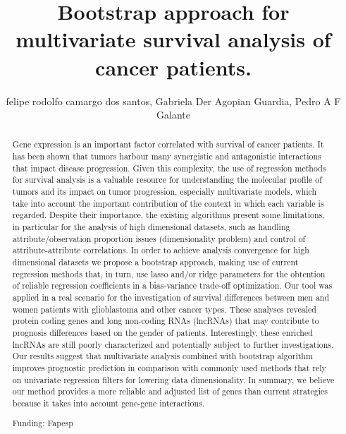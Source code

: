\documentclass[twoside]{article}
\title{\vspace{-15mm}\fontsize{24pt}{10pt}\selectfont\textbf{ Bootstrap approach for multivariate survival analysis of  cancer patients. }} %
\author{ felipe rodolfo camargo dos santos, Gabriela Der Agopian Guardia, Pedro A F Galante }
\affil{ Instituto de Ensino e Pesquisa - Hospital S\'{\i}rio Liban\^es }
\date{}
\begin{document}
  
  
  \maketitle %
  
  
  \thispagestyle{fancy} %
  
  
  \begin{abstract}
  Gene expression is an important factor correlated with survival of cancer patients. It has been shown that tumors harbour many synergistic and antagonistic interactions that impact disease progression. Given this complexity,  the use of regression methods for survival analysis is a valuable resource for understanding the molecular profile of tumors and its impact on tumor progression,  especially multivariate models,  which take into account the important contribution of the context in which each variable is regarded. Despite their importance,  the existing algorithms present some limitations,  in particular for the analysis of high dimensional datasets,  such as handling attribute/observation proportion issues (dimensionality problem) and control of attribute-attribute correlations. In order to achieve analysis convergence for high dimensional datasets we propose a bootstrap approach,  making use of current regression methods that,  in turn,  use lasso and/or ridge parameters for the obtention of reliable regression coefficients in a bias-variance trade-off optimization. Our tool was applied in a real scenario for the  investigation of  survival differences between men and women patients with glioblastoma and other cancer types. These analyses revealed protein coding genes and long non-coding RNAs (lncRNAs) that may contribute to prognosis differences based on the gender of patients. Interestingly,  these enriched lncRNAs are still poorly characterized and potentially subject to further investigations. Our results  suggest that multivariate analysis combined with bootstrap algorithm improves prognostic prediction in comparison with commonly used methods that rely on univariate regression filters for lowering data dimensionality. In summary,  we believe our method provides a more reliable and adjusted list of genes than current strategies because it takes into account gene-gene interactions.
  
  Funding: Fapesp \\ 
  \end{abstract}
  
\end{document}
